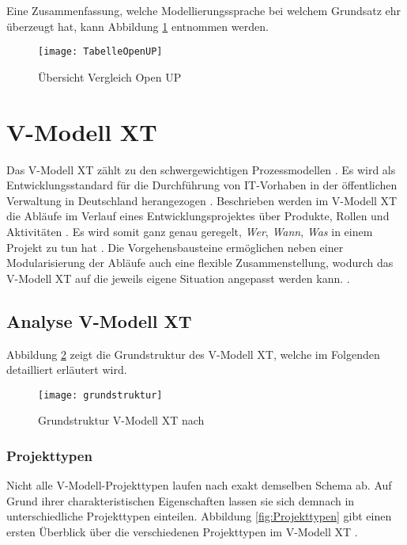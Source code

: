 Eine Zusammenfassung, welche Modellierungssprache bei welchem Grundsatz ehr überzeugt hat, kann Abbildung \ref{fig:TabelleOpenUP} entnommen werden. \newline


\begin{figure}[htp]
\begin{center}
  \texttt{[image: TabelleOpenUP]} %
  \caption{Übersicht Vergleich Open UP}
  \label{fig:TabelleOpenUP}
\end{center}
\end{figure}


\section{V-Modell XT}


Das V-Modell XT zählt zu den schwergewichtigen Prozessmodellen \cite{Hanser2010}. Es wird als Entwicklungsstandard für die Durchführung von IT-Vorhaben in der öffentlichen Verwaltung in Deutschland herangezogen \cite{Kuhrmann2011}. Beschrieben werden im V-Modell XT die Abläufe im Verlauf eines Entwicklungsprojektes über Produkte, Rollen und Aktivitäten \cite{Friedrich2008}. Es wird somit ganz genau geregelt, \textit{Wer}, \textit{Wann}, \textit{Was} in einem Projekt zu tun hat \cite{2004vmodell}. Die Vorgehensbausteine ermöglichen neben einer Modularisierung der Abläufe auch eine flexible Zusammenstellung, wodurch das V-Modell XT auf die jeweils eigene Situation angepasst werden kann. \cite{Friedrich2008,Zoerner2012}. \newline
\subsection{Analyse V-Modell XT}

Abbildung \ref{fig:grundstruktur} zeigt die Grundstruktur des V-Modell XT, welche im Folgenden detailliert erläutert wird.
\begin{figure}[htp]
\begin{center}
  \texttt{[image: grundstruktur]} %
  \caption{Grundstruktur V-Modell XT nach \cite{2004vmodell}}
  \label{fig:grundstruktur}
\end{center}
\end{figure}

\subsubsection{Projekttypen}
Nicht alle V-Modell-Projekttypen laufen nach exakt demselben Schema ab. Auf Grund ihrer charakteristischen Eigenschaften lassen sie sich demnach in unterschiedliche Projekttypen einteilen. Abbildung \ref{fig:Projekttypen} gibt einen ersten Überblick über die verschiedenen Projekttypen im V-Modell XT \cite{2004vmodell}.

